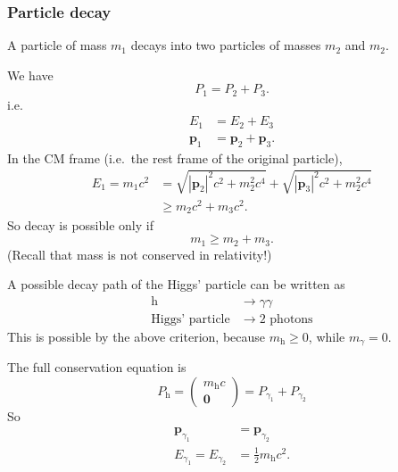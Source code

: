 \documentclass[a4paper]{article}
\begin{document}
\subsubsection*{Particle decay}
A particle of mass $m_1$ decays into two particles of masses $m_2$ and $m_2$.

We have
\[
  P_1 = P_2 + P_3.
\]
i.e.
\begin{align*}
  E_1 &= E_2 + E_3\\
  \mathbf{p}_1 &= \mathbf{p}_2 + \mathbf{p}_3.
\end{align*}
In the CM frame (i.e.\ the rest frame of the original particle),
\begin{align*}
  E_1 = m_1 c^2 &= \sqrt{|\mathbf{p}_2|^2 c^2 + m_2^2c^4} + \sqrt{|\mathbf{p}_3|^2 c^2 + m_2^2 c^4}\\
  &\geq m_2c^2 + m_3 c^2.
\end{align*}
So decay is possible only if
\[
  m_1 \geq m_2 + m_3.
\]
(Recall that mass is not conserved in relativity!)

\begin{eg}
  A possible decay path of the Higgs' particle can be written as
  \begin{align*}
    \mathrm{h} &\to \gamma \gamma\\
    \text{Higgs'\ particle} &\to 2\text{ photons}
  \end{align*}
  This is possible by the above criterion, because $m_\mathrm{h} \geq 0$, while $m_\gamma = 0$.

  The full conservation equation is
  \[
    P_\mathrm{h} =
    \begin{pmatrix}
      m_\mathrm{h}c\\
      \mathbf{0}
    \end{pmatrix} =
    P_{\gamma_1} + P_{\gamma_2}
  \]
  So
  \begin{align*}
    \mathbf{p}_{\gamma_1} &= \mathbf{p}_{\gamma_2}\\
    E_{\gamma_1} = E_{\gamma_2} &= \frac{1}{2}m_\mathrm{h} c^2.
  \end{align*}
\end{eg}
\end{document}
